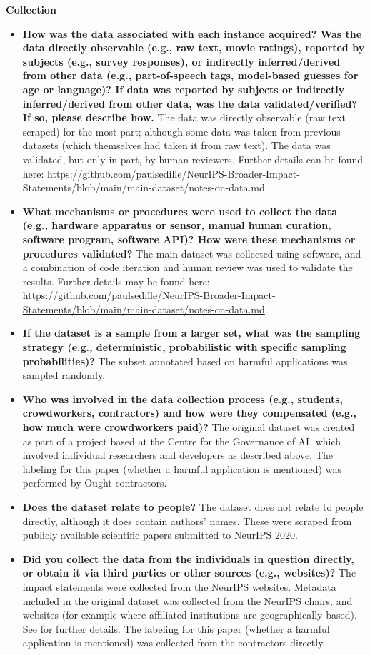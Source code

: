 \documentclass{article}
\begin{document}
\textbf{Collection}

\begin{itemize}
    \item \textbf{How was the data associated with each instance acquired? Was the data directly observable (e.g., raw text, movie ratings), reported by subjects (e.g., survey responses), or indirectly inferred/derived from other data (e.g., part-of-speech tags, model-based guesses for age or language)? If data was reported by subjects or indirectly inferred/derived from other data, was the data validated/verified? If so, please describe how.} The data was directly observable (raw text scraped) for the most part; although some data was taken from previous datasets (which themselves had taken it from raw text). The data was validated, but only in part, by human reviewers. Further details can be found here: https://github.com/paulsedille/NeurIPS-Broader-Impact-Statements/blob/main/main-dataset/notes-on-data.md
    \item \textbf{What mechanisms or procedures were used to collect the data (e.g., hardware apparatus or sensor, manual human curation, software program, software API)? How were these mechanisms or procedures validated?} The main dataset was collected using software, and a combination of code iteration and human review was used to validate the results. Further details may be found here: \href{https://github.com/paulsedille/NeurIPS-Broader-Impact-Statements/blob/main/main-dataset/notes-on-data.md}{https://github.com/paulsedille/NeurIPS-Broader-Impact-Statements/blob/main/main-dataset/notes-on-data.md}.
    \item \textbf{If the dataset is a sample from a larger set, what was the sampling strategy (e.g., deterministic, probabilistic with specific sampling probabilities)?} The subset annotated based on harmful applications was sampled randomly.
    \item \textbf{Who was involved in the data collection process (e.g., students, crowdworkers, contractors) and how were they compensated (e.g., how much were crowdworkers paid)?} The original dataset was created as part of a project based at the Centre for the Governance of AI, which involved individual researchers and developers as described above. The labeling for this paper (whether a harmful application is mentioned) was performed by Ought contractors. 
    \item \textbf{Does the dataset relate to people?} The dataset does not relate to people directly, although it does contain authors' names. These were scraped from publicly available scientific papers submitted to NeurIPS 2020.
    \item \textbf{Did you collect the data from the individuals in question directly, or obtain it via third parties or other sources (e.g., websites)?} The impact statements were collected from the NeurIPS websites. Metadata included in the original dataset was collected from the NeurIPS chairs, and websites (for example where affiliated institutions are geographically based). See \citep{ashurst2021aiethics} for further details. The labeling for this paper (whether a harmful application is mentioned) was collected from the contractors directly.
\end{itemize}
\end{document}

